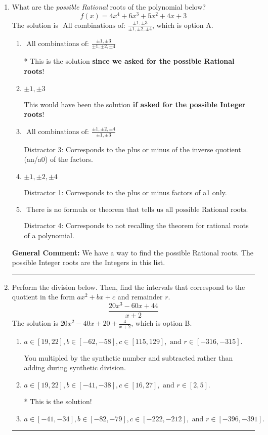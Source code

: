 \documentclass{extbook}[14pt]
\newcommand{\litem}[1]{\item #1

\rule{\textwidth}{0.4pt}}
\begin{document}
\begin{enumerate}\litem{
What are the \textit{possible Rational} roots of the polynomial below?
\[ f(x) = 4x^{4} +6 x^{3} +5 x^{2} +4 x + 3 \]The solution is \( \text{ All combinations of: }\frac{\pm 1,\pm 3}{\pm 1,\pm 2,\pm 4} \), which is option A.\begin{enumerate}[label=\Alph*.]
\item \( \text{ All combinations of: }\frac{\pm 1,\pm 3}{\pm 1,\pm 2,\pm 4} \)

* This is the solution \textbf{since we asked for the possible Rational roots}!
\item \( \pm 1,\pm 3 \)

This would have been the solution \textbf{if asked for the possible Integer roots}!
\item \( \text{ All combinations of: }\frac{\pm 1,\pm 2,\pm 4}{\pm 1,\pm 3} \)

 Distractor 3: Corresponds to the plus or minus of the inverse quotient (an/a0) of the factors. 
\item \( \pm 1,\pm 2,\pm 4 \)

 Distractor 1: Corresponds to the plus or minus factors of a1 only.
\item \( \text{ There is no formula or theorem that tells us all possible Rational roots.} \)

 Distractor 4: Corresponds to not recalling the theorem for rational roots of a polynomial.
\end{enumerate}

\textbf{General Comment:} We have a way to find the possible Rational roots. The possible Integer roots are the Integers in this list.
}
\litem{
Perform the division below. Then, find the intervals that correspond to the quotient in the form $ax^2+bx+c$ and remainder $r$.
\[ \frac{20x^{3} -60 x + 44}{x + 2} \]The solution is \( 20x^{2} -40 x + 20 + \frac{4}{x + 2} \), which is option B.\begin{enumerate}[label=\Alph*.]
\item \( a \in [19, 22], b \in [-62, -58], c \in [115, 129], \text{ and } r \in [-316, -315]. \)

 You multipled by the synthetic number and subtracted rather than adding during synthetic division.
\item \( a \in [19, 22], b \in [-41, -38], c \in [16, 27], \text{ and } r \in [2, 5]. \)

* This is the solution!
\item \( a \in [-41, -34], b \in [-82, -79], c \in [-222, -212], \text{ and } r \in [-396, -391]. \)


\end{enumerate}}
\end{enumerate}
\end{document}
